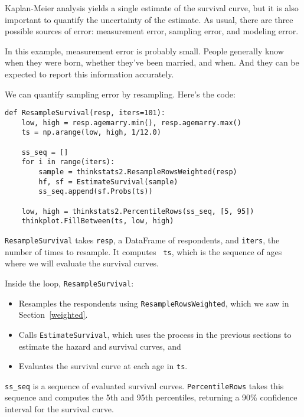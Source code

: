 \documentclass[12pt]{book}
\begin{document}
Kaplan-Meier analysis yields a single estimate of the survival curve,
but it is also important to quantify the uncertainty of the estimate.
As usual, there are three possible sources of error: measurement
error, sampling error, and modeling error.

In this example, measurement error is probably small.  People
generally know when they were born, whether they've been married, and
when.  And they can be expected to report this information accurately.

We can quantify sampling error by resampling.  Here's the code:

\begin{verbatim}
def ResampleSurvival(resp, iters=101):
    low, high = resp.agemarry.min(), resp.agemarry.max()
    ts = np.arange(low, high, 1/12.0)

    ss_seq = []
    for i in range(iters):
        sample = thinkstats2.ResampleRowsWeighted(resp)
        hf, sf = EstimateSurvival(sample)
        ss_seq.append(sf.Probs(ts))

    low, high = thinkstats2.PercentileRows(ss_seq, [5, 95])
    thinkplot.FillBetween(ts, low, high)
\end{verbatim}

{\tt ResampleSurvival} takes {\tt resp}, a DataFrame of respondents,
and {\tt iters}, the number of times to resample.  It computes {\tt
  ts}, which is the sequence of ages where we will evaluate the survival
curves.

Inside the loop, {\tt ResampleSurvival}:

\begin{itemize}

\item Resamples the respondents using {\tt ResampleRowsWeighted},
which we saw in Section~\ref{weighted}.

\item Calls {\tt EstimateSurvival}, which uses the process in the
previous sections to estimate the hazard and survival curves, and

\item Evaluates the survival curve at each age in {\tt ts}.

\end{itemize}

\verb"ss_seq" is a sequence of evaluated survival curves.
{\tt PercentileRows} takes this sequence and computes the 5th and 95th
percentiles, returning a 90\% confidence interval for the survival
curve.
\end{document}
